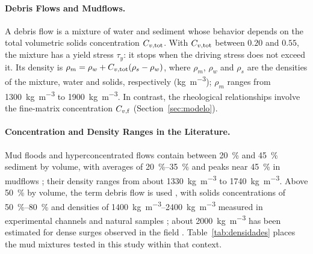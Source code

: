 \paragraph{Debris Flows and Mudflows.} A debris flow is a mixture of water and sediment whose behavior depends on the total volumetric solids concentration $C_{v,\mathrm{tot}}$. With $C_{v,\mathrm{tot}}$ between $0.20$ and $0.55$, the mixture has a yield stress $\tau_y$: it stops when the driving stress does not exceed it. Its density is $\rho_m=\rho_w+C_{v,\mathrm{tot}}(\rho_s-\rho_w)$, where $\rho_m$, $\rho_w$ and $\rho_s$ are the densities of the mixture, water and solids, respectively (\si{kg.m^{-3}}); $\rho_m$ ranges from \SI{1300}{kg.m^{-3}} to \SI{1900}{kg.m^{-3}}. In contrast, the rheological relationships involve the fine-matrix concentration $C_{v,\mathrm{f}}$ (Section~\ref{sec:modelo}).

\paragraph{Concentration and Density Ranges in the Literature.} Mud floods and hyperconcentrated flows contain between \SI{20}{\percent} and \SI{45}{\percent} sediment by volume, with averages of \SIrange{20}{35}{\percent} and peaks near \SI{45}{\percent} in mudflows \citep{obrien1988,flo2d2021}; their density ranges from about \SI{1330}{kg.m^{-3}} to \SI{1740}{kg.m^{-3}}. Above \SI{50}{\percent} by volume, the term debris flow is used \citep{costa1984,zanuttigh2007}, with solids concentrations of \SIrange{50}{80}{\percent} and densities of \SIrange{1400}{2400}{kg.m^{-3}} measured in experimental channels and natural samples \citep{iverson1997}; about \SI{2000}{kg.m^{-3}} has been estimated for dense surges observed in the field \citep{zanuttigh2007}. Table~\ref{tab:densidades} places the mud mixtures tested in this study within that context.

